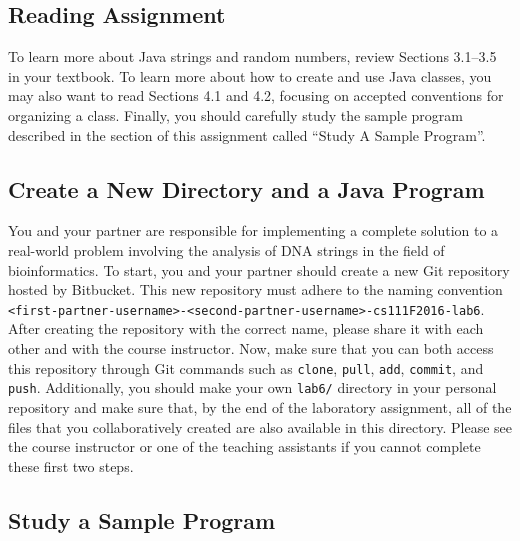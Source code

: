 \vspace{-0.2in}
\subsection*{Reading Assignment}
\vspace{-0.05in}

To learn more about Java strings and random numbers, review Sections 3.1--3.5 in your textbook. To learn more about how
to create and use Java classes, you may also want to read Sections 4.1 and 4.2, focusing on accepted conventions for
organizing a class. Finally, you should carefully study the sample program described in the section of this assignment
called ``{Study A Sample Program}''.

\vspace{-0.05in}
\subsection*{Create a New Directory and a Java Program}
\vspace{-0.05in}

You and your partner are responsible for implementing a complete solution to a real-world problem involving the analysis
of DNA strings in the field of bioinformatics. To start, you and your partner should create a new Git repository hosted
by Bitbucket. This new repository must adhere to the naming convention {\tt
<first-partner-username>-<second-partner-username>-cs111F2016-lab6}. After creating the repository with the correct
name, please share it with each other and with the course instructor. Now, make sure that you can both access this
repository through Git commands such as {\tt clone}, {\tt pull}, {\tt add}, {\tt commit}, and {\tt push}. Additionally,
you should make your own {\tt lab6/} directory in your personal repository and make sure that, by the end of the
laboratory assignment, all of the files that you collaboratively created are also available in this directory. Please
see the course instructor or one of the teaching assistants if you cannot complete these first two steps.


\vspace{-0.1in}
\subsection*{Study a Sample Program}
\vspace{-0.05in}

